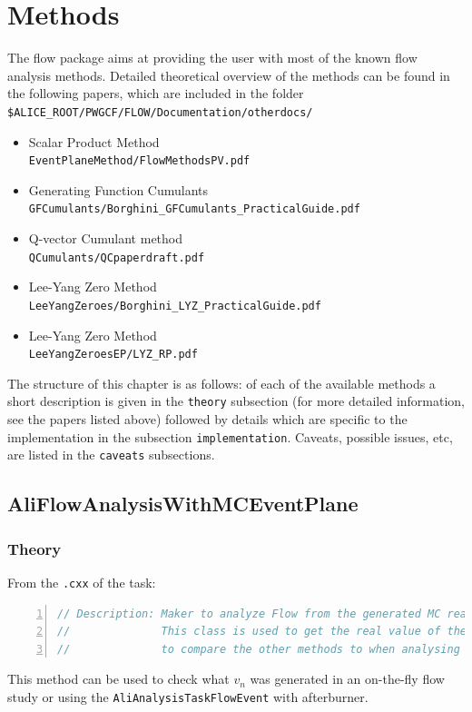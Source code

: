 \documentclass[a4paper]{book}
\numberwithin{equation}{subsection}
\begin{document}
\chapter{Methods}
\label{sec:methods}
The flow package aims at providing the user with most of the known flow analysis methods. Detailed theoretical overview of the methods can be found in the following papers, which are included in the folder \texttt{\$ALICE\_ROOT/PWGCF/FLOW/Documentation/otherdocs/}
\begin{itemize}
	\item Scalar Product Method \\ \hspace*{1cm} \texttt{EventPlaneMethod/FlowMethodsPV.pdf}
	\item Generating Function Cumulants \\ \hspace*{1cm} \texttt{GFCumulants/Borghini\_GFCumulants\_PracticalGuide.pdf}
	\item Q-vector Cumulant method \\ \hspace*{1cm} \texttt{QCumulants/QCpaperdraft.pdf} 
        \item Lee-Yang Zero Method \\ \hspace*{1cm} \texttt{LeeYangZeroes/Borghini\_LYZ\_PracticalGuide.pdf}
	\item Lee-Yang Zero Method \\ \hspace*{1cm} \texttt{LeeYangZeroesEP/LYZ\_RP.pdf}
\end{itemize}
The structure of this  chapter is as follows: of each of the available methods a short description is given in the \texttt{theory} subsection (for more detailed information, see the papers listed above) followed by details which are specific to the implementation in the subsection \texttt{implementation}. Caveats, possible issues, etc, are listed in the \texttt{caveats} subsections. 

 \section{AliFlowAnalysisWithMCEventPlane}
\label{sec:MC}
\subsection{Theory}
From the \texttt{.cxx} of the task: 
\begin{lstlisting}[language=C, numbers=left]
// Description: Maker to analyze Flow from the generated MC reaction plane.
//              This class is used to get the real value of the flow 
//              to compare the other methods to when analysing simulated events.\end{lstlisting}
This method can be used to check what $v_n$ was generated in an on-the-fly flow study or using the \texttt{AliAnalysisTaskFlowEvent} with afterburner. 
\end{document}
